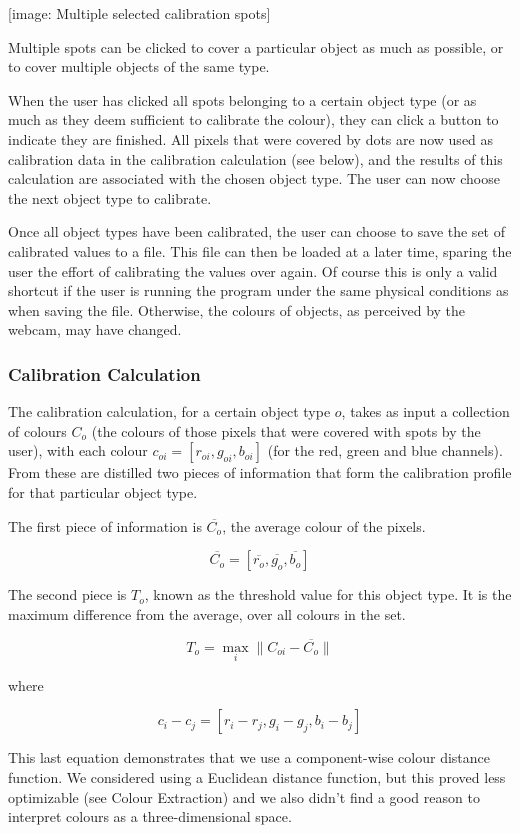 \documentclass[10pt,twocolumn]{article}
\begin{document}
[image: Multiple selected calibration spots]

Multiple spots can be clicked to cover a particular object as much as possible, or to cover multiple objects of the same type.

When the user has clicked all spots belonging to a certain object type (or as much as they deem sufficient to calibrate the colour), they can click a button to indicate they are finished. All pixels that were covered by dots are now used as calibration data in the calibration calculation (see below), and the results of this calculation are associated with the chosen object type. The user can now choose the next object type to calibrate.

Once all object types have been calibrated, the user can choose to save the set of calibrated values to a file. This file can then be loaded at a later time, sparing the user the effort of calibrating the values over again. Of course this is only a valid shortcut if the user is running the program under the same physical conditions as when saving the file. Otherwise, the colours of objects, as perceived by the webcam, may have changed.

\subsubsection{Calibration Calculation}

The calibration calculation, for a certain object type $o$, takes as input a collection of colours $C_o$ (the colours of those pixels that were covered with spots by the user), with each colour $c_{oi} = [r_{oi},g_{oi},b_{oi}]$ (for the red, green and blue channels). From these are distilled two pieces of information that form the calibration profile for that particular object type.

The first piece of information is $\overline{C_o}$, the average colour of the pixels.
 
\[
\overline{C_o} = [ \overline{r_o},\overline{g_o},\overline{b_o} ]
\]

The second piece is $T_o$, known as the threshold value for this object type. It is the maximum difference from the average, over all colours in the set.

\[
T_o = \max_{i} \lVert C_{oi} - \overline{C_o} \rVert
\]

where

\[
c_i - c_j = [r_{i}-r_{j},g_{i}-g_{j},b_{i}-b_{j}]
\]

This last equation demonstrates that we use a component-wise colour distance function. We considered using a Euclidean distance function, but this proved less optimizable (see Colour Extraction) and we also didn't find a good reason to interpret colours as a three-dimensional space.
\end{document}
